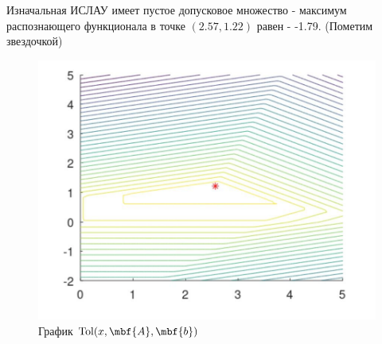 \documentclass[12pt,a4paper]{article}
\begin{document}
    
    Изначальная ИСЛАУ имеет пустое допусковое множество - максимум распознающего функционала в точке $(2.57,1.22)$ равен - -1.79. (Пометим звездочкой)
    \begin{figure}[H]
        \centering
        \includegraphics[width=16cm]{max_tol.png}
        \caption{График $\mathrm{Tol}(x,\mbf{A},\mbf{b})$}
        \label{fig:origtol}
    \end{figure}
    
\end{document}
